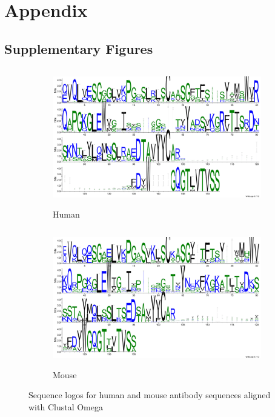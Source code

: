 \documentclass[11pt]{article}
\begin{document}
\clearpage

\appendix
\renewcommand{\thefigure}{S\arabic{figure}}
\setcounter{figure}{0}


\section{Appendix}

\subsection{Supplementary Figures}

\begin{figure}[h]
	
	\begin{subfigure}{0.5\textwidth}
		\includegraphics[width=0.9\linewidth, height=6cm]{images/human_msa_clustalO_logo.pdf} 
		\caption{Human}
	\end{subfigure}
	\begin{subfigure}{0.5\textwidth}
		\includegraphics[width=0.9\linewidth, height=6cm]{images/mouse_msa_clustalO_logo.pdf}
		\caption{Mouse}
	\end{subfigure}
	
	\caption{Sequence logos for human and mouse antibody sequences aligned with Clustal Omega}
	\label{fig:clustalo_logo}
\end{figure}
\end{document}
